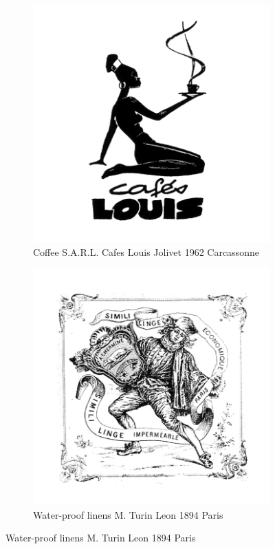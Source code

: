\begin{figure}[h]
  \centering
  \begin{subfigure}{.45\textwidth}
    \centering
    \includegraphics[width=.5\linewidth]{images/supplement/trademarks/french/15_47}
    \caption[]{Coffee S.A.R.L. Cafes Louis Jolivet 1962 Carcassonne}
    \label{fig:trademarks:french:15.47}
  \end{subfigure}\hfill
  \begin{subfigure}{.45\textwidth}
    \centering
    \includegraphics[width=.5\linewidth]{images/supplement/trademarks/french/20_4}
    \caption[]{Water-proof linens M. Turin Leon 1894 Paris}
    \label{fig:trademarks:french:20.4}
  \end{subfigure}


\end{figure}
